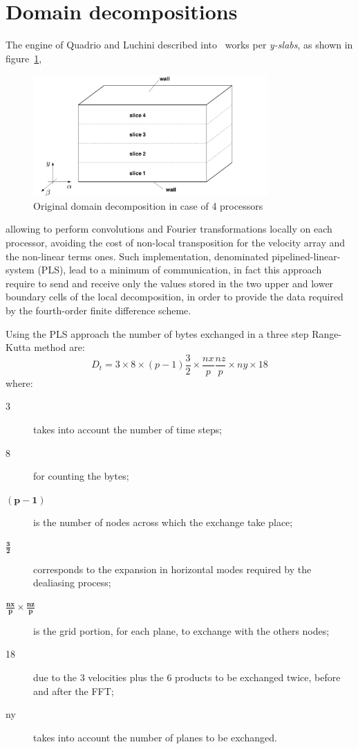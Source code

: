 \section{Domain decompositions}
The engine of Quadrio and Luchini described into~\cite{cpl:presentazione} works per \emph{y-slabs}, as shown in figure~\ref{domain_decomp},
\begin{figure}
\centering
\includegraphics[width=0.8\textwidth]{grafici/decomp_dominio_cpl}
\caption{Original domain decomposition in case of 4 processors}
\label{domain_decomp}
\end{figure}
 allowing to perform convolutions and Fourier transformations locally on each processor, avoiding the cost of non-local transposition for the velocity array and the non-linear terms ones. Such implementation, denominated pipelined-linear-system (PLS), lead to a minimum of communication, in fact this approach require to send and receive only the values stored in the two upper and lower boundary cells of the local decomposition, in order to provide the data required by the fourth-order finite difference scheme.
 \par
 Using the PLS approach the number of bytes exchanged in a three step Range-Kutta method are:
 \begin{equation}
 D_{t} = 3 \times 8 \times (p-1) \frac{3}{2} \times \frac{nx}{p} \frac{nz}{p} \times ny \times 18
 \label{exchange:data:cpl}
 \end{equation}
 where:
 \begin{description}
  \item[3] takes into account the number of time steps;
  \item[8] for counting the bytes;
  \item[$\mathbf{(p-1)}$] is the number of nodes across which the exchange take place;
  \item[ $\mathbf{\frac{3}{2}}$ ] corresponds to the expansion in horizontal modes required by the dealiasing process;
  \item[ $\mathbf{\frac{nx}{p} \times \frac{nz}{p}}$] is the grid portion, for each plane, to exchange with the others nodes;
  \item[18] due to the 3 velocities plus the 6 products to be exchanged twice, before and after the FFT;
  \item[ny] takes into account the number of planes to be exchanged.
\end{description}
